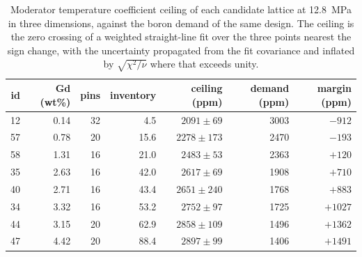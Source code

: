 \begin{table}[htbp]
  \centering
  \caption[Boron ceiling of each candidate lattice]{Moderator temperature coefficient ceiling of each candidate lattice at \SI{12.8}{MPa} in three dimensions, against the boron demand of the same design. The ceiling is the zero crossing of a weighted straight-line fit over the three points nearest the sign change, with the uncertainty propagated from the fit covariance and inflated by $\sqrt{\chi^2/\nu}$ where that exceeds unity.}
  \label{tab:c9-ceilings}
  \begin{tabular}{rrrrrrr}
    \toprule
    id & Gd (wt\%) & pins & inventory & ceiling (ppm) & demand (ppm) & margin (ppm) \\
    \midrule
    12 & 0.14 & 32 & 4.5 & $2091 \pm 69$ & 3003 & $-912$ \\
    57 & 0.78 & 20 & 15.6 & $2278 \pm 173$ & 2470 & $-193$ \\
    58 & 1.31 & 16 & 21.0 & $2483 \pm 53$ & 2363 & $+120$ \\
    35 & 2.63 & 16 & 42.0 & $2617 \pm 69$ & 1908 & $+710$ \\
    40 & 2.71 & 16 & 43.4 & $2651 \pm 240$ & 1768 & $+883$ \\
    34 & 3.32 & 16 & 53.2 & $2752 \pm 97$ & 1725 & $+1027$ \\
    44 & 3.15 & 20 & 62.9 & $2858 \pm 109$ & 1496 & $+1362$ \\
    47 & 4.42 & 20 & 88.4 & $2897 \pm 99$ & 1406 & $+1491$ \\
    \bottomrule
  \end{tabular}
\end{table}
